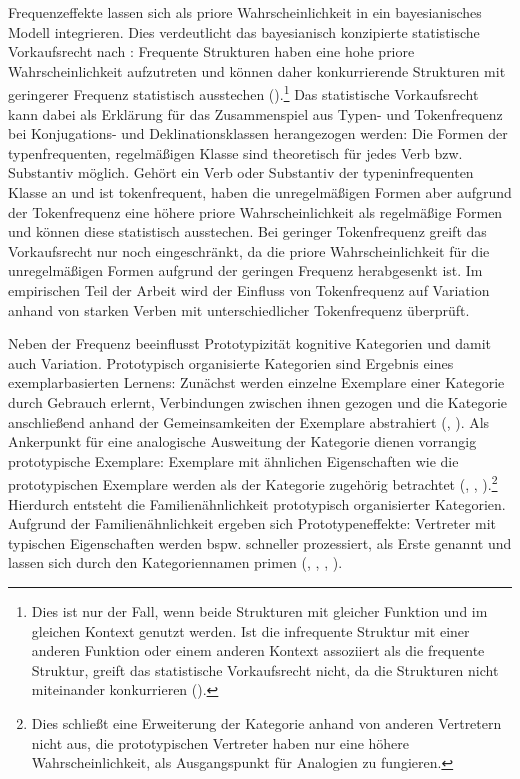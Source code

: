 \begin{sloppypar}
Frequenzeffekte lassen sich als priore Wahrscheinlichkeit in ein bayesianisches Modell integrieren. Dies verdeutlicht das bayesianisch konzipierte statistische Vorkaufsrecht nach \textcite[74--94]{Goldberg.2019}: Frequente Strukturen haben eine hohe priore Wahrscheinlichkeit aufzutreten und können daher konkurrierende Strukturen mit geringerer Frequenz statistisch ausstechen (\cite[74--94]{Goldberg.2019}).\footnote{Dies ist nur der Fall, wenn beide Strukturen mit gleicher Funktion und im gleichen Kontext genutzt werden. Ist die infrequente Struktur mit einer anderen Funktion oder einem anderen Kontext assoziiert als die frequente Struktur, greift das statistische Vorkaufsrecht nicht, da die Strukturen nicht miteinander konkurrieren (\cite[74--94]{Goldberg.2019}).} Das statistische Vorkaufsrecht kann dabei als Erklärung für das Zusammenspiel aus Typen- und Tokenfrequenz bei Konjugations- und Deklinationsklassen herangezogen werden: Die Formen der typenfrequenten, regelmäßigen Klasse sind theoretisch für jedes Verb bzw. Substantiv möglich. Gehört ein Verb oder Substantiv der typeninfrequenten Klasse an und ist tokenfrequent, haben die unregelmäßigen Formen aber aufgrund der Tokenfrequenz eine höhere priore Wahrscheinlichkeit als regelmäßige Formen und können diese statistisch ausstechen. Bei geringer Tokenfrequenz greift das Vorkaufsrecht nur noch eingeschränkt, da die priore Wahrscheinlichkeit für die unregelmäßigen Formen aufgrund der geringen Frequenz herabgesenkt ist. Im empirischen Teil der Arbeit wird der Einfluss von Tokenfrequenz auf Variation anhand von starken Verben mit unterschiedlicher Tokenfrequenz überprüft.
\end{sloppypar}
 
Neben der Frequenz beeinflusst Prototypizität kognitive Kategorien und damit auch Variation. Prototypisch organisierte Kategorien sind Ergebnis eines exemplarbasierten Lernens: Zunächst werden einzelne Exemplare einer Kategorie durch Gebrauch erlernt, Verbindungen zwischen ihnen gezogen und die Kategorie anschließend anhand der Gemeinsamkeiten der Exemplare abstrahiert (\cite[206--209]{Goldberg.1998}, \cite[216--222]{Ross.1999}). Als Ankerpunkt für eine analogische Ausweitung der Kategorie dienen vorrangig prototypische Exemplare: Exemplare mit ähnlichen Eigenschaften wie die prototypischen Exemplare werden als der Kategorie zugehörig betrachtet (\cite[89]{Goldberg.2006}, \cite[242]{Ellis.2016}, \cite[51--73]{Goldberg.2019}).\footnote{Dies schließt eine Erweiterung der Kategorie anhand von anderen Vertretern nicht aus, die prototypischen Vertreter haben nur eine höhere Wahrscheinlichkeit, als Ausgangspunkt für Analogien zu fungieren.} Hierdurch entsteht die Familienähnlichkeit prototypisch organisierter Kategorien. Aufgrund der Familienähnlichkeit ergeben sich Prototypeneffekte: Vertreter mit typischen Eigenschaften werden bspw. schneller prozessiert, als Erste genannt und lassen sich durch den Kategoriennamen primen (\cite{Rosch.1975b}, \cite[38--39]{Kleiber.1993}, \cite[45]{Taylor.1995}, \cite[85]{Ellis.2014}).

